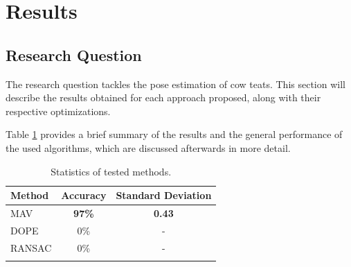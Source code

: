 \section{Results} \label{chap:4:results}
\subsection{Research Question}
\label{sec:results-research-question}

The research question tackles the pose estimation of cow teats. This section will describe the results obtained for each approach proposed, along with their respective optimizations. 

Table \ref{tab:test-results} provides a brief summary of the results and the general performance of the used algorithms, which are discussed afterwards in more detail.

\begin{longtable}
{@{} l c c @{}} \toprule
\textbf{Method}                     & \textbf{Accuracy}     & \textbf{Standard Deviation}       \\ \midrule
MAV                                 & \textbf{97\% }                 & \textbf{0.43}                             \\ \midrule
DOPE                                & 0\%                  & -                             \\ \midrule
RANSAC                              & 0\%                   & -                             \\ \bottomrule
\caption{Statistics of tested methods.} \label{tab:test-results}                          \\
\end{longtable}

